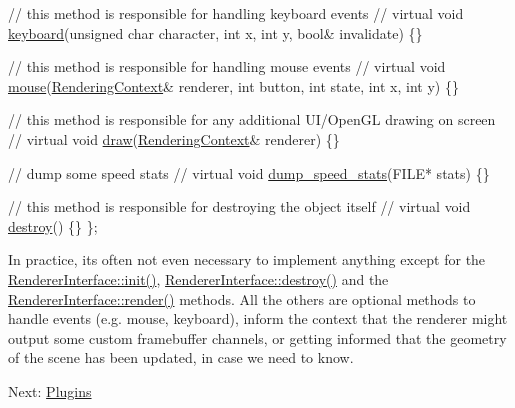 \begin{DoxyParagraph}{}
\begin{DoxyCode}
   \textcolor{comment}{// this method is responsible for handling keyboard events}
   \textcolor{comment}{//}
   \textcolor{keyword}{virtual} \textcolor{keywordtype}{void} \hyperlink{struct_renderer_interface_a9f5afd3701d8d935a2ecf08fb9f5f604}{keyboard}(\textcolor{keywordtype}{unsigned} \textcolor{keywordtype}{char} character, \textcolor{keywordtype}{int} x, \textcolor{keywordtype}{int} y, \textcolor{keywordtype}{bool}& invalidate) \{\}

   \textcolor{comment}{// this method is responsible for handling mouse events}
   \textcolor{comment}{//}
   \textcolor{keyword}{virtual} \textcolor{keywordtype}{void} \hyperlink{struct_renderer_interface_aae7f55e0f8863e6a2ed3205d228ab306}{mouse}(\hyperlink{struct_rendering_context}{RenderingContext}& renderer, \textcolor{keywordtype}{int} button, \textcolor{keywordtype}{int} state, \textcolor{keywordtype}{int} x, \textcolor{keywordtype}{int} y)
       \{\}

   \textcolor{comment}{// this method is responsible for any additional UI/OpenGL drawing on screen}
   \textcolor{comment}{//}
   \textcolor{keyword}{virtual} \textcolor{keywordtype}{void} \hyperlink{struct_renderer_interface_a44e91217896e95a3fd46b26eef51a6da}{draw}(\hyperlink{struct_rendering_context}{RenderingContext}& renderer) \{\}

   \textcolor{comment}{// dump some speed stats}
   \textcolor{comment}{//}
   \textcolor{keyword}{virtual} \textcolor{keywordtype}{void} \hyperlink{struct_renderer_interface_a378df3aa18095da5ce8011fb25c8fb8e}{dump\_speed\_stats}(FILE* stats) \{\}

   \textcolor{comment}{// this method is responsible for destroying the object itself}
   \textcolor{comment}{//}
   \textcolor{keyword}{virtual} \textcolor{keywordtype}{void} \hyperlink{struct_renderer_interface_a7469218aafa029a3e22bac2c00dca9f5}{destroy}() \{\}
\};
\end{DoxyCode}

\end{DoxyParagraph}
\begin{DoxyParagraph}{}
In practice, it\textquotesingle{}s often not even necessary to implement anything except for the \hyperlink{struct_renderer_interface_a2ead9b943d6d48fcd32872e0005ebe63}{Renderer\+Interface\+::init()}, \hyperlink{struct_renderer_interface_a7469218aafa029a3e22bac2c00dca9f5}{Renderer\+Interface\+::destroy()} and the \hyperlink{struct_renderer_interface_aa64254dd44c94929b05092dc8d74f29d}{Renderer\+Interface\+::render()} methods. All the others are optional methods to handle events (e.\+g. mouse, keyboard), inform the context that the renderer might output some custom framebuffer channels, or getting informed that the geometry of the scene has been updated, in case we need to know.
\end{DoxyParagraph}
Next\+: \hyperlink{_plugins_page}{Plugins} 